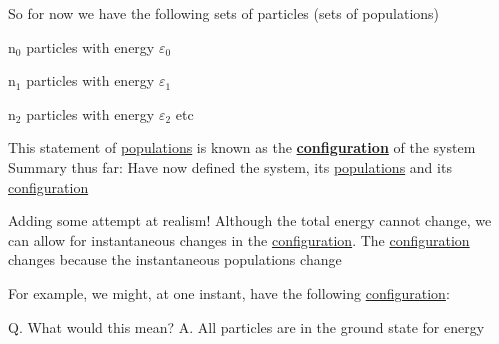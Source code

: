 \documentclass[a4paper,12pt,titlepage]{article}
\begin{document}
\begin{frame}[allowframebreaks]
So for now we have the following sets of particles (sets of populations)\newline
 
n\(_0\) particles with energy \(\varepsilon_0\)\newline
 
n\(_1\) particles with energy \(\varepsilon_1\)\newline
 
n\(_2\) particles with energy \(\varepsilon_2\)    etc\newline
 
This statement of \underline{populations} is known as the \underline{\textbf{configuration}} of the system\newline
Summary thus far:\newline
Have now defined the system, its \underline{populations} and its \underline{configuration}\newline
 
Adding some attempt at realism!\newline
Although the total energy cannot change, we can allow for instantaneous changes in the \underline{configuration}. 
The \underline{configuration} changes because the instantaneous populations change\newline

For example, we might, at one instant, have the following \underline{configuration}:\newline

\newline
 
Q. What would this mean? \newline
A. All particles are in the ground state for energy
\end{frame}
\end{document}
